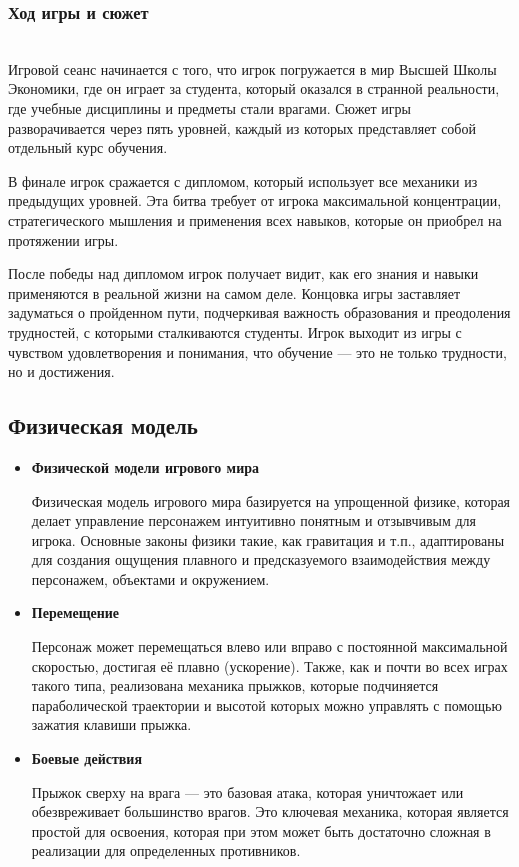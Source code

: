\documentclass{article}
\begin{document}
\subsubsection{Ход игры и сюжет}
    \\Игровой сеанс начинается с того, что игрок погружается в мир Высшей Школы Экономики, где он играет за студента, который оказался в странной реальности, где учебные дисциплины и предметы стали врагами. Сюжет игры разворачивается через пять уровней, каждый из которых представляет собой отдельный курс обучения.\par
    В финале игрок сражается с дипломом, который использует все механики из предыдущих уровней. Эта битва требует от игрока максимальной концентрации, стратегического мышления и применения всех навыков, которые он приобрел на протяжении игры.\par
    После победы над дипломом игрок получает видит, как его знания и навыки применяются в реальной жизни на самом деле. Концовка игры заставляет задуматься о пройденном пути, подчеркивая важность образования и преодоления трудностей, с которыми сталкиваются студенты.
    Игрок выходит из игры с чувством удовлетворения и понимания, что обучение — это не только трудности, но и достижения.

\subsection{Физическая модель}
    \begin{itemize}
    \item \textbf{Физической модели игрового мира} \par
    Физическая модель игрового мира базируется на упрощенной физике, которая делает управление персонажем интуитивно понятным и отзывчивым для игрока. Основные законы физики такие, как гравитация и т.п., адаптированы для создания ощущения плавного и предсказуемого взаимодействия между персонажем, объектами и окружением.
    \item \textbf{Перемещение} \par
    Персонаж может перемещаться влево или вправо с постоянной максимальной скоростью, достигая её плавно (ускорение). Также, как и почти во всех играх такого типа, реализована механика прыжков, которые подчиняется параболической траектории и высотой которых можно управлять с помощью зажатия клавиши прыжка.
    \item \textbf{Боевые действия} \par
    Прыжок сверху на врага — это базовая атака, которая уничтожает или обезвреживает большинство врагов. Это ключевая механика, которая является простой для освоения, которая при этом может быть достаточно сложная в реализации для определенных противников.
    \end{itemize}
\end{document}
